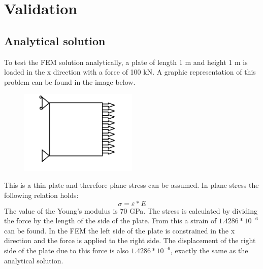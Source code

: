 \chapter{Validation}

\section{Analytical solution}
To test the FEM solution analytically, a plate of length 1 m and height 1 m is loaded in the x direction with a force of 100 kN. A graphic representation of this problem can be found in the image below.

\begin{figure}[h!]
    \parbox [t]{\textwidth}
        {
        \center
        \includegraphics[width=0.5\textwidth]{IMG/analytisch.png}
        }
\end{figure}

This is a thin plate and therefore plane stress can be assumed. In plane stress the following relation holds:
\[\sigma=\varepsilon*E\]
The value of the Young's modulus is 70 GPa. The stress is calculated by dividing the force by the length of the side of the plate. From this a strain of \(1.4286*10^{-6}\) can be found. 
In the FEM the left side of the plate is constrained in the x direction and the force is applied to the right side. The displacement of the right side of the plate due to this force is also \(1.4286*10^{-6}\), exactly the same as the analytical solution. 
